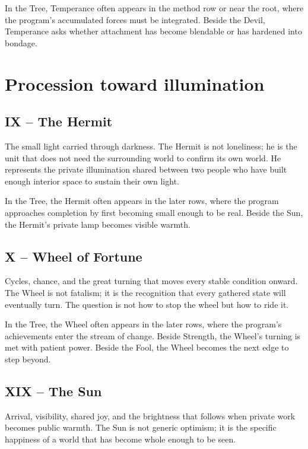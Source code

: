 In the Tree, Temperance often appears in the method row or near the root, where
the program's accumulated forces must be integrated. Beside the Devil,
Temperance asks whether attachment has become blendable or has hardened into
bondage.

\section{Procession toward illumination}

\subsection{IX -- The Hermit}

The small light carried through darkness. The Hermit is not loneliness; he is
the unit that does not need the surrounding world to confirm its own world. He
represents the private illumination shared between two people who have built
enough interior space to sustain their own light.

In the Tree, the Hermit often appears in the later rows, where the program
approaches completion by first becoming small enough to be real. Beside the
Sun, the Hermit's private lamp becomes visible warmth.

\subsection{X -- Wheel of Fortune}

Cycles, chance, and the great turning that moves every stable condition onward.
The Wheel is not fatalism; it is the recognition that every gathered state will
eventually turn. The question is not how to stop the wheel but how to ride it.

In the Tree, the Wheel often appears in the later rows, where the program's
achievements enter the stream of change. Beside Strength, the Wheel's turning
is met with patient power. Beside the Fool, the Wheel becomes the next edge to
step beyond.

\subsection{XIX -- The Sun}

Arrival, visibility, shared joy, and the brightness that follows when private
work becomes public warmth. The Sun is not generic optimism; it is the specific
happiness of a world that has become whole enough to be seen.

